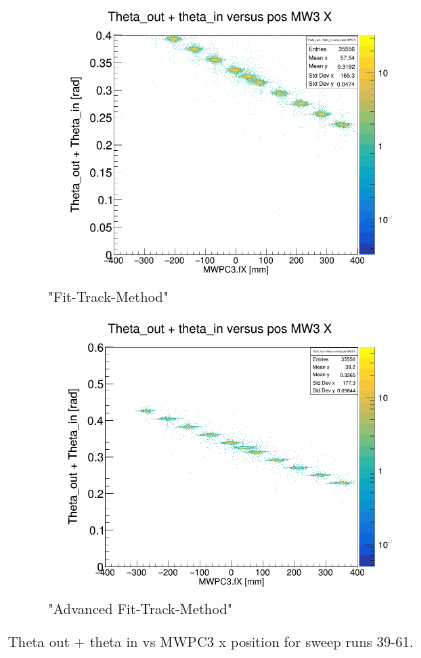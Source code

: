 \documentclass[12pt, letterpaper]{article}
\begin{document}
\begin{figure}[!htbp]
\begin{subfigure}{.5\textwidth}
  \label{fig:sub-second}
\end{subfigure}
\begin{subfigure}{.5\textwidth}
  \centering
  \includegraphics[width=.9\linewidth]{plot_imgs/theta_out_theta_in_mw3_fit.png} 
  \caption{"Fit-Track-Method"}
  \label{fig:sub-second}
\end{subfigure}
\begin{subfigure}{.5\textwidth}
  \centering
  \includegraphics[width=.9\linewidth]{plot_imgs/theta_out_theta_in_mw3_last.png} 
  \caption{"Advanced Fit-Track-Method"}
  \label{fig:sub-second}
\end{subfigure}
\caption{Theta \textunderscore out + theta \textunderscore in vs MWPC3 x position for sweep runs 39-61.}
\label{fig:fig}
\end{figure}
\FloatBarrier
\clearpage
\end{document}
